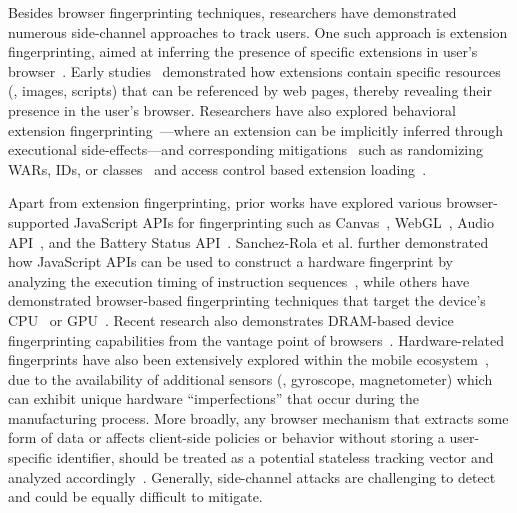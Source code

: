 Besides browser fingerprinting techniques, researchers have demonstrated numerous side-channel approaches to track users.
%
One such approach is extension fingerprinting, aimed at inferring the presence of specific extensions in user's browser~\cite{karamiCarnusExploringPrivacy2020}. 
%
Early studies~\cite{sjostenDiscoveringBrowserExtensions2017, gulyasExtendNotExtend2018, karamiCarnusExploringPrivacy2020} demonstrated how extensions contain specific resources (\eg{}, images, scripts) that can be referenced by web pages, thereby revealing their presence in the user's browser. 
%
Researchers have also explored behavioral extension fingerprinting~\cite{starovXHOUNDQuantifyingFingerprintability2017, karamiCarnusExploringPrivacy2020, solomosDangersHumanTouch2022, solomosEscapingConfinesTime2022, laperdrixFingerprintingStyleDetecting2021, agarwalPeekingWindowFingerprinting2024}---where an extension can be implicitly inferred through executional side-effects---and corresponding mitigations~\cite{karamiUnleashSimulacrumShifting2022, sanchez-rolaExtensionBreakdownSecurity2017} such as randomizing WARs, IDs, or classes~\cite{trickelEveryoneDifferentClientside2019} and access control based extension loading~\cite{sjostenLatexGlovesProtecting2019}. 


Apart from extension fingerprinting, prior works have explored various browser-supported JavaScript APIs for fingerprinting such as Canvas~\cite{moweryPixelPerfectFingerprinting2012}, WebGL~\cite{caoCrossBrowserFingerprintingOS2017}, Audio API~\cite{englehardtOnlineTracking1millionsite2016}, and the Battery Status API~\cite{olejnikLeakingBatteryPrivacy2016}. 
%
Sanchez-Rola et al. further demonstrated how JavaScript APIs can be used to construct a hardware fingerprint by analyzing the execution timing of instruction sequences~\cite{sanchez-rolaClockClockTimeBased2018}, while others have demonstrated browser-based fingerprinting techniques that target the device's CPU~\cite{trampertBrowserBasedCPUFingerprinting2022,matyuninTrackingPrivateBrowsing2018} or GPU~\cite{laorDRAWNAPARTDevice2022}. 
%
Recent research also demonstrates DRAM-based device fingerprinting capabilities from the vantage point of browsers~\cite{venugopalanFPRowhammerDRAMBasedDevice2024}.
%
Hardware-related fingerprints have also been extensively explored within the mobile ecosystem~\cite{bojinovMobileDeviceIdentification2014,dasTrackingMobileWeb2016,marcantoniLargescaleStudyRisks2019,hupperichRobustnessMobileDevice2015,deyAccelPrintImperfectionsAccelerometers2014,zhang2019sensorid}, due to the availability of additional sensors (\eg{}, gyroscope, magnetometer) which can exhibit unique hardware ``imperfections'' that occur during the manufacturing process. 
%
More broadly, any browser mechanism that extracts some form of data or affects client-side policies or behavior without storing a user-specific identifier, should be treated as a potential stateless tracking vector and analyzed accordingly~\cite{aliNavigatingMurkyWaters2023}. 
%
Generally, side-channel attacks are challenging to detect and could be equally difficult to mitigate.


